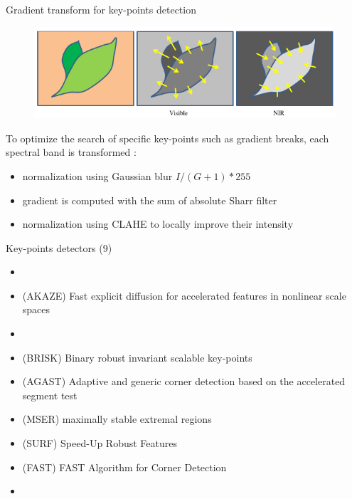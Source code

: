 \documentclass{beamer}
\begin{document}
		\begin{frame}{Gradient transform for key-points detection}
			\begin{figure}
				\includegraphics[width=0.7\linewidth]{../figures/contrast-inversion.png}
			\end{figure}
		
			To optimize the search of specific key-points such as gradient breaks,
			each spectral band is transformed :
			\begin{itemize}
				\item normalization using Gaussian blur $I/(G+1)*255$ 
				\item gradient is computed with the sum of absolute Sharr filter
				\item normalization using CLAHE to locally improve their intensity
			\end{itemize}
		\end{frame}
	
		\begin{frame}{Key-points detectors (9)}
			\begin{itemize}
				\item {\color{orange}{(ORB) Oriented FAST and Rotated BRIEF}}
				\item (AKAZE) Fast explicit diffusion for accelerated features in nonlinear scale spaces
				\item {\color{orange}{(KAZE) A novel multi-scale 2D feature detection and description algorithm in nonlinear scale spaces}}
				\item (BRISK) Binary robust invariant scalable key-points
				\item (AGAST) Adaptive and generic corner detection based on the accelerated segment test
				\item (MSER) maximally stable extremal regions
				\item (SURF) Speed-Up Robust Features
				\item (FAST) FAST Algorithm for Corner Detection
				\item {\color{purple}{(GFTT) Good Features To Track}}
			\end{itemize}
		\end{frame}
	
\end{document}
